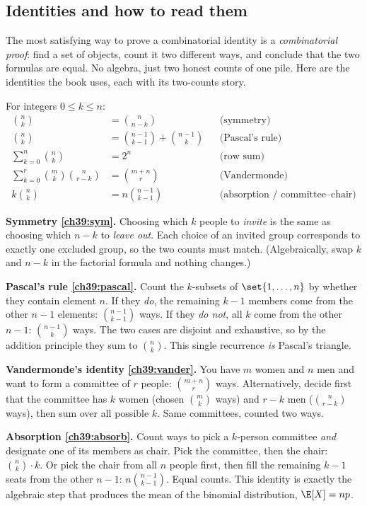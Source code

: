 \subsection{Identities and how to read them}

The most satisfying way to prove a combinatorial identity is a
\emph{combinatorial proof}: find a set of objects, count it two different
ways, and conclude that the two formulas are equal. No algebra, just two honest
counts of one pile. Here are the identities the book uses, each with its
two-counts story.

\begin{formalbox}
For integers $0 \le k \le n$:
\begin{align}
\binom{n}{k} &= \binom{n}{n-k}
  &&\text{(symmetry)} \label{ch39:sym}\\[0.2em]
\binom{n}{k} &= \binom{n-1}{k-1} + \binom{n-1}{k}
  &&\text{(Pascal's rule)} \label{ch39:pascal}\\[0.2em]
\sum_{k=0}^{n}\binom{n}{k} &= 2^{n}
  &&\text{(row sum)} \label{ch39:rowsum}\\[0.2em]
\sum_{k=0}^{r}\binom{m}{k}\binom{n}{r-k} &= \binom{m+n}{r}
  &&\text{(Vandermonde)} \label{ch39:vander}\\[0.2em]
k\binom{n}{k} &= n\binom{n-1}{k-1}
  &&\text{(absorption / committee--chair)} \label{ch39:absorb}
\end{align}
\end{formalbox}

\begin{whybox}
\textbf{Symmetry \eqref{ch39:sym}.} Choosing which $k$ people to \emph{invite}
is the same as choosing which $n-k$ to \emph{leave out}. Each choice of an
invited group corresponds to exactly one excluded group, so the two counts
must match. (Algebraically, swap $k$ and $n-k$ in the factorial formula and
nothing changes.)

\textbf{Pascal's rule \eqref{ch39:pascal}.} Count the $k$-subsets of
$\set{1,\dots,n}$ by whether they contain element $n$. If they \emph{do}, the
remaining $k-1$ members come from the other $n-1$ elements:
$\binom{n-1}{k-1}$ ways. If they \emph{do not}, all $k$ come from the other
$n-1$: $\binom{n-1}{k}$ ways. The two cases are disjoint and exhaustive, so by
the addition principle they sum to $\binom{n}{k}$. This single recurrence
\emph{is} Pascal's triangle.

\textbf{Vandermonde's identity \eqref{ch39:vander}.} You have $m$ women and
$n$ men and want to form a committee of $r$ people: $\binom{m+n}{r}$ ways.
Alternatively, decide first that the committee has $k$ women (chosen
$\binom{m}{k}$ ways) and $r-k$ men ($\binom{n}{r-k}$ ways), then sum over all
possible $k$. Same committees, counted two ways.

\textbf{Absorption \eqref{ch39:absorb}.} Count ways to pick a $k$-person
committee \emph{and} designate one of its members as chair. Pick the committee,
then the chair: $\binom{n}{k}\cdot k$. Or pick the chair from all $n$ people
first, then fill the remaining $k-1$ seats from the other $n-1$:
$n\binom{n-1}{k-1}$. Equal counts. This identity is exactly the algebraic step
that produces the mean of the binomial distribution, $\E[X] = np$.
\end{whybox}

